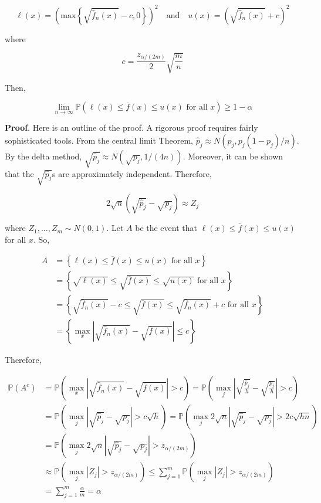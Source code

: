 \[
\ell(x) = \left( \text{max} \left\{\sqrt{\hat{f}_{n}(x)} - c, 0\right\} \right)^{2}
\quad \text{and} \quad
u(x) = \left(\sqrt{\hat{f}_{n}(x)} + c \right)^{2}
\]

where

\[
c = \frac{z_{\alpha / (2 m)}}{2} \sqrt{\frac{m}{n}}
\]

Then,

\[
\lim_{n \rightarrow \infty} \mathbb{P} \left( \ell(x) \leq \overline{f}(x) \leq u(x) \text{ for all } x \right) \geq 1 - \alpha
\]

\textbf{Proof}. Here is an outline of the proof. A rigorous proof
requires fairly sophisticated tools. From the central limit Theorem,
\(\hat{p}_{j} \approx N\left(p_{j}, p_{j} (1 - p_{j}) / n\right)\). By the delta
method, \(\sqrt{\hat{p}_{j}} \approx N\left(\sqrt{p_{j}}, 1 / (4n)\right)\).
Moreover, it can be shown that the \(\sqrt{\hat{p}_{j}}\)s are
approximately independent. Therefore,

\[ 2 \sqrt{n} \left( \sqrt{\hat{p}_{j}} - \sqrt{p_{j}} \right) \approx Z_{j} \]

where \(Z_{1}, \dots, Z_m \sim N(0, 1)\). Let \(A\) be the event that
\(\ell(x) \leq \overline{f}(x) \leq u(x)\) for all \(x\). So,

\begin{align*}
A &= \left\{ \ell(x) \leq \overline{f}(x) \leq u(x) \text{ for all } x \right\} \\
&= \left\{ \sqrt{\ell(x)} \leq \sqrt{\overline{f}(x)} \leq \sqrt{u(x)} \text{ for all } x \right\} \\
&= \left\{ \sqrt{\hat{f}_{n}(x)} - c \leq \sqrt{\overline{f}(x)} \leq \sqrt{\hat{f}_{n}(x)} + c \text{ for all } x \right\} \\
&= \left\{ \max_x \left| \sqrt{\hat{f}_{n}(x)} - \sqrt{\overline{f}(x)} \right| \leq c \right\}
\end{align*}

Therefore,

\begin{align*}
\mathbb{P}(A^{c}) &= \mathbb{P} \left( \max_x \left| \sqrt{\hat{f}_{n}(x)} - \sqrt{\overline{f}(x)} \right| > c\right)
= \mathbb{P} \left( \max_{j} \left| \sqrt{\frac{\hat{p}_{j}}{h}} - \sqrt{\frac{p_{j}}{h}} \right| > c\right) \\
&= \mathbb{P} \left( \max_{j} \left| \sqrt{\hat{p}_{j}} - \sqrt{p_{j}} \right| > c \sqrt{h} \right)
= \mathbb{P} \left( \max_{j} 2 \sqrt{n} \left| \sqrt{\hat{p}_{j}} - \sqrt{p_{j}} \right| > 2 c \sqrt{hn} \right) \\
&= \mathbb{P} \left( \max_{j} 2 \sqrt{n} \left| \sqrt{\hat{p}_{j}} - \sqrt{p_{j}} \right| > z_{\alpha / (2m)} \right) \\
&\approx \mathbb{P} \left( \max_{j} \left| Z_{j} \right| > z_{\alpha / (2m)} \right)
 \leq \sum_{j=1}^m \mathbb{P} \left( \max_{j} \left| Z_{j} \right| > z_{\alpha / (2m)} \right) \\
&= \sum_{j=1}^m \frac{\alpha}{m} = \alpha
\end{align*}

